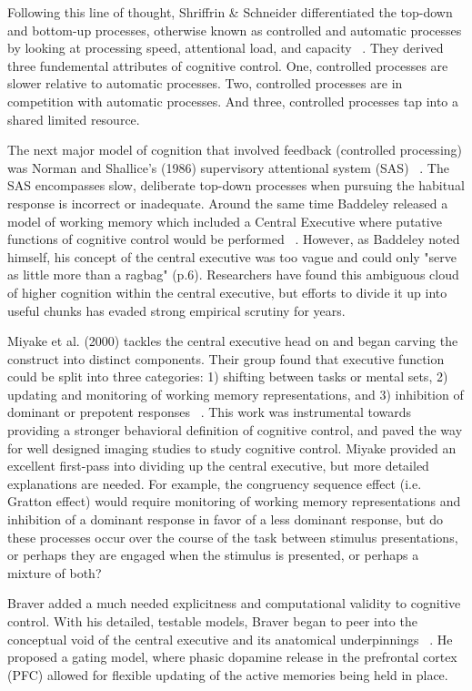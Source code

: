 \documentclass[phd,appendix,figures]{uithesis}
\begin{document}
Following this line of thought, Shriffrin \& Schneider differentiated the top-down and bottom-up processes, otherwise known as controlled and automatic processes by looking at processing speed, attentional load, and capacity ~\citep{Shiffrin1977}. 
They derived three fundemental attributes of cognitive control.
One, controlled processes are slower relative to automatic processes. 
Two, controlled processes are in competition with automatic processes. 
And three, controlled processes tap into a shared limited resource.

The next major model of cognition that involved feedback (controlled processing) was Norman and Shallice's (1986) supervisory attentional system (SAS) ~\citep{Norman1986}. 
The SAS encompasses slow, deliberate top-down processes when pursuing the habitual response is incorrect or inadequate.
Around the same time Baddeley released a model of working memory which included a Central Executive where putative functions of cognitive control would be performed ~\citep{Baddeley1996}.
However, as Baddeley noted himself, his concept of the central executive was too vague and could only "serve as little more than a ragbag" (p.6). 
Researchers have found this ambiguous cloud of higher cognition within the central executive, but efforts to divide it up into useful chunks has evaded strong empirical scrutiny for years.

Miyake et al. (2000) tackles the central executive head on and began carving the construct into distinct components. 
Their group found that executive function could be split into three categories:
1) shifting between tasks or mental sets,
2) updating and monitoring of working memory representations, and
3) inhibition of dominant or prepotent responses ~\citep{Miyake2000}.
This work was instrumental towards providing a stronger behavioral definition of cognitive control, and paved the way for well designed imaging studies to study cognitive control.
Miyake provided an excellent first-pass into dividing up the central executive, but more detailed explanations are needed.
For example, the congruency sequence effect (i.e. Gratton effect) would require monitoring of working memory representations and inhibition of a dominant response in favor of a less dominant response, but do these processes occur over the course of the task between stimulus presentations, or perhaps they are engaged when the stimulus is presented, or perhaps a mixture of both?

Braver added a much needed explicitness and computational validity to cognitive control. With his detailed, testable models, Braver began to peer into the conceptual void of the central executive and its anatomical underpinnings ~\citep{Braver2001}. 
He proposed a gating model, where phasic dopamine release in the prefrontal cortex (PFC) allowed for flexible updating of the active memories being held in place.
\end{document}
